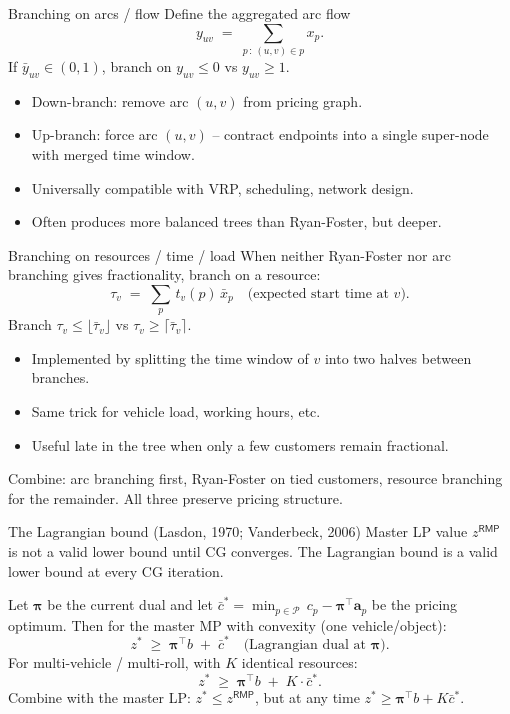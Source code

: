\documentclass[10pt,aspectratio=169]{beamer}
\newcommand{\transpose}{^{\!\top}}
\newcommand{\rmp}{\mathsf{RMP}}
\newcommand{\redcost}{\bar{c}}
\begin{document}
\begin{frame}{Branching on arcs / flow}
  Define the \alert{aggregated arc flow}
  \[
    y_{uv} \;=\; \sum_{p\,:\,(u,v)\in p} x_p .
  \]
  If $\bar y_{uv}\in(0,1)$, branch on $y_{uv}\le 0$ vs $y_{uv}\ge 1$.

  \medskip
  \begin{itemize}\small
    \item Down-branch: \alert{remove arc $(u,v)$} from pricing graph.
    \item Up-branch: \alert{force arc $(u,v)$} -- contract endpoints into a
          single super-node with merged time window.
    \item Universally compatible with VRP, scheduling, network design.
    \item Often produces more balanced trees than Ryan-Foster, but deeper.
  \end{itemize}
\end{frame}

\begin{frame}{Branching on resources / time / load}
  When neither Ryan-Foster nor arc branching gives fractionality, branch on a
  resource:
  \[
     \tau_v \;=\; \sum_p\, t_v(p)\, \bar x_p \quad
     \text{(expected start time at } v\text{)}.
  \]
  Branch $\tau_v\le \lfloor\bar\tau_v\rfloor$ vs $\tau_v\ge \lceil\bar\tau_v\rceil$.

  \begin{itemize}\small
    \item Implemented by \alert{splitting the time window} of $v$ into two
          halves between branches.
    \item Same trick for vehicle load, working hours, etc.
    \item Useful late in the tree when only a few customers remain
          fractional.
  \end{itemize}

  \begin{keybox}
    Combine: arc branching first, Ryan-Foster on tied customers, resource
    branching for the remainder. All three preserve pricing structure.
  \end{keybox}
\end{frame}

\begin{frame}{The Lagrangian bound (Lasdon, 1970; Vanderbeck, 2006)}
  Master LP value $z^{\rmp}$ is \alert{not} a valid lower bound until CG converges.
  The Lagrangian bound is a valid lower bound at \alert{every} CG iteration.

  \medskip
  Let $\boldsymbol\pi$ be the current dual and let
  $\redcost^* = \min_{p\in\mathcal P}\, c_p - \boldsymbol\pi\transpose \mathbf a_p$
  be the pricing optimum. Then for the master MP with convexity (one
  vehicle/object):
  \[
    z^* \;\ge\; \boldsymbol\pi\transpose b \;+\; \redcost^*\quad
    \text{(Lagrangian dual at } \boldsymbol\pi\text{).}
  \]
  For multi-vehicle / multi-roll, with $K$ identical resources:
  \[
    z^* \;\ge\; \boldsymbol\pi\transpose b \;+\; K\cdot \redcost^*.
  \]
  Combine with the master LP: $z^* \le z^{\rmp}$, but at any time
  $z^*\ge\boldsymbol\pi\transpose b + K\redcost^*$.
\end{frame}
\end{document}
